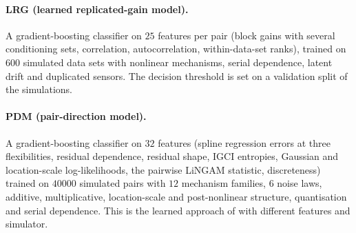 \paragraph{LRG (learned replicated-gain model).} A gradient-boosting classifier on $25$
features per pair (block gains with several conditioning sets, correlation,
autocorrelation, within-data-set ranks), trained on $600$ simulated data sets with
nonlinear mechanisms, serial dependence, latent drift and duplicated sensors. The decision
threshold is set on a validation split of the simulations.

\paragraph{PDM (pair-direction model).} A gradient-boosting classifier on $32$ features
(spline regression errors at three flexibilities, residual dependence, residual shape,
IGCI entropies, Gaussian and location-scale log-likelihoods, the pairwise LiNGAM
statistic, discreteness) trained on $40000$ simulated pairs with $12$ mechanism families,
$6$ noise laws, additive, multiplicative, location-scale and post-nonlinear structure,
quantisation and serial dependence. This is the learned approach of
\citet{lopezpaz2015towards} with different features and simulator.
